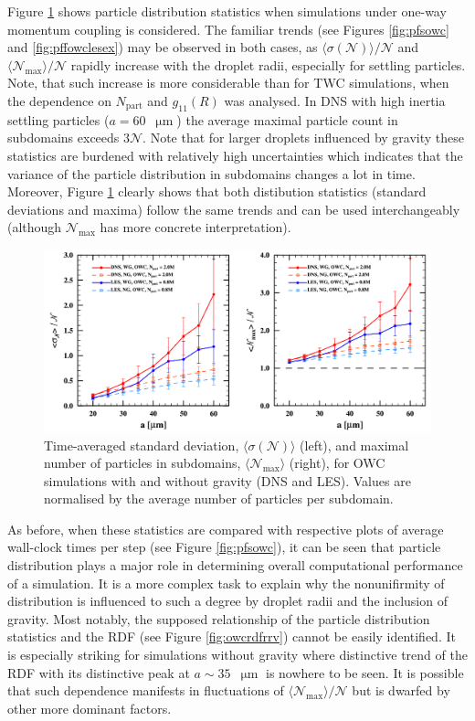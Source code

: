 \documentclass{pracamgren}
\begin{document}
Figure \ref{fig:pfpowc} shows particle distribution statistics when simulations under one-way momentum coupling is considered.
The familiar trends (see Figures \ref{fig:pfsowc} and \ref{fig:pffowclesex}) may be observed in both cases, as $\langle \sigma(\mathcal{N}) \rangle / \mathcal{N}$ and $\langle \mathcal{N}_{\max} \rangle / \mathcal{N}$ rapidly increase with the droplet radii, especially for settling particles.
Note, that such increase is more considerable than for TWC simulations, when the dependence on $N_{\text{part}}$ and $g_{11}(R)$ was analysed.
In DNS with high inertia settling particles (${a = 60}$~$\upmu\text{m}$) the average maximal particle count in subdomains exceeds $3 \mathcal{N}$.
Note that for larger droplets influenced by gravity these statistics are burdened with relatively high uncertainties which indicates that the variance of the particle distribution in subdomains changes a lot in time.
Moreover, Figure \ref{fig:pfpowc} clearly shows that both distibution statistics (standard deviations and maxima) follow the same trends and can be used interchangeably (although $\mathcal{N}_{\max}$ has more concrete interpretation).

\begin{figure}[ht]
\centering
\includegraphics[width=13.5cm]{figures/3-17_pfpowc.pdf}
\caption{
Time-averaged standard deviation, $\langle \sigma(\mathcal{N}) \rangle$ (left), and maximal number of particles in subdomains, $\langle \mathcal{N}_{\max} \rangle$ (right), for OWC simulations with and without gravity (DNS and LES).
Values are normalised by the average number of particles per subdomain.
}
\label{fig:pfpowc}
\end{figure}

As before, when these statistics are compared with respective plots of average wall-clock times per step (see Figure \ref{fig:pfsowc}), it can be seen that particle distribution plays a major role in determining overall computational performance of a simulation.
It is a more complex task to explain why the nonunifirmity of distribution is influenced to such a degree by droplet radii and the inclusion of gravity.
Most notably, the supposed relationship of the particle distribution statistics and the RDF (see Figure \ref{fig:owcrdfrrv}) cannot be easily identified.
It is especially striking for simulations without gravity where distinctive trend of the RDF with its distinctive peak at $a \sim 35$~$\upmu\text{m}$ is nowhere to be seen.
It is possible that such dependence manifests in fluctuations of $\langle \mathcal{N}_{\max} \rangle / \mathcal{N}$ but is dwarfed by other more dominant factors.
  
\end{document}
